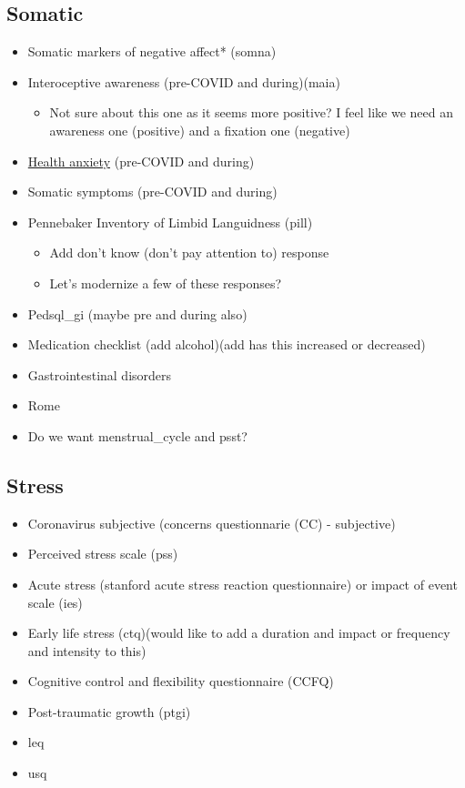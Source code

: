 \documentclass[]{book}
\providecommand{\tightlist}{%
  \setlength{\itemsep}{0pt}\setlength{\parskip}{0pt}}
\begin{document}
\hypertarget{somatic}{%
\subsection{Somatic}\label{somatic}}

\begin{itemize}
\tightlist
\item
  Somatic markers of negative affect* (somna)
\item
  Interoceptive awareness (pre-COVID and during)(maia)

  \begin{itemize}
  \tightlist
  \item
    Not sure about this one as it seems more positive? I feel like we need an awareness one (positive) and a fixation one (negative)
  \end{itemize}
\item
  \href{https://psychology-tools.com/test/health-anxiety-inventory}{Health anxiety} (pre-COVID and during)
\item
  Somatic symptoms (pre-COVID and during)
\item
  Pennebaker Inventory of Limbid Languidness (pill)

  \begin{itemize}
  \tightlist
  \item
    Add don't know (don't pay attention to) response
  \item
    Let's modernize a few of these responses?
  \end{itemize}
\item
  Pedsql\_gi (maybe pre and during also)
\item
  Medication checklist (add alcohol)(add has this increased or decreased)
\item
  Gastrointestinal disorders
\item
  Rome
\item
  Do we want menstrual\_cycle and psst?
\end{itemize}

\hypertarget{stress}{%
\subsection{Stress}\label{stress}}

\begin{itemize}
\tightlist
\item
  Coronavirus subjective (concerns questionnarie (CC) - subjective)
\item
  Perceived stress scale (pss)
\item
  Acute stress (stanford acute stress reaction questionnaire) or impact of event scale (ies)
\item
  Early life stress (ctq)(would like to add a duration and impact or frequency and intensity to this)
\item
  Cognitive control and flexibility questionnaire (CCFQ)
\item
  Post-traumatic growth (ptgi)
\item
  leq
\item
  usq
\end{itemize}
\end{document}
